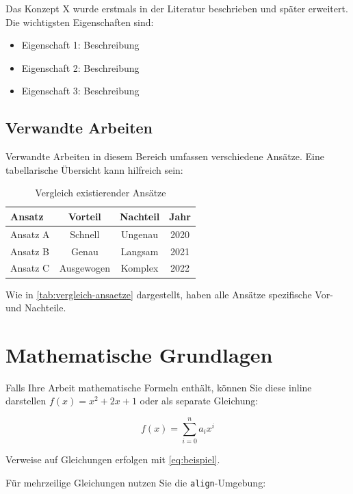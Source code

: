 Das Konzept X wurde erstmals in der Literatur beschrieben und später erweitert. Die wichtigsten Eigenschaften sind:
\begin{itemize}
    \item Eigenschaft 1: Beschreibung
    \item Eigenschaft 2: Beschreibung
    \item Eigenschaft 3: Beschreibung
\end{itemize}

\subsection{Verwandte Arbeiten}

Verwandte Arbeiten in diesem Bereich umfassen verschiedene Ansätze. Eine tabellarische Übersicht kann hilfreich sein:

\begin{table}[htbp]
    \centering
    \caption{Vergleich existierender Ansätze}
    \label{tab:vergleich-ansaetze}
    \begin{tabular}{lccc}
        \toprule
        \textbf{Ansatz} & \textbf{Vorteil} & \textbf{Nachteil} & \textbf{Jahr} \\
        \midrule
        Ansatz A & Schnell & Ungenau & 2020 \\
        Ansatz B & Genau & Langsam & 2021 \\
        Ansatz C & Ausgewogen & Komplex & 2022 \\
        \bottomrule
    \end{tabular}
\end{table}

Wie in \autoref{tab:vergleich-ansaetze} dargestellt, haben alle Ansätze spezifische Vor- und Nachteile.

\section{Mathematische Grundlagen}
\label{sec:mathematik}

Falls Ihre Arbeit mathematische Formeln enthält, können Sie diese inline darstellen $f(x) = x^2 + 2x + 1$ oder als separate Gleichung:

\begin{equation}
    \label{eq:beispiel}
    f(x) = \sum_{i=0}^{n} a_i x^i
\end{equation}

Verweise auf Gleichungen erfolgen mit \autoref{eq:beispiel}.

Für mehrzeilige Gleichungen nutzen Sie die \texttt{align}-Umgebung:

